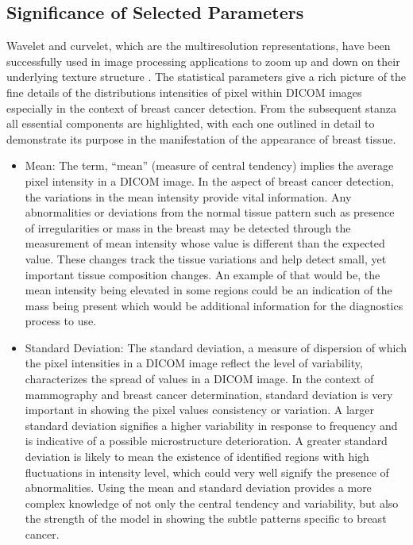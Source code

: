 \subsection{Significance of Selected Parameters}
Wavelet and curvelet, which are the multiresolution representations, have been successfully used in image processing applications to zoom up and down on their underlying texture structure \cite{MESELHYELTOUKHY2012123}. The statistical parameters give a rich picture of the fine details of the distributions intensities of pixel within DICOM images especially in the context of breast cancer detection. From the subsequent stanza all essential components are highlighted, with each one outlined in detail to demonstrate its purpose in the manifestation of the appearance of breast tissue.
\begin{itemize}
  \item Mean: The term, “mean” (measure of central tendency) implies the average pixel intensity in a DICOM image. In the aspect of breast cancer detection, the variations in the mean intensity provide vital information. Any abnormalities or deviations from the normal tissue pattern such as presence of irregularities or mass in the breast may be detected through the measurement of mean intensity whose value is different than the expected value. These changes track the tissue variations and help detect small, yet important tissue composition changes. An example of that would be, the mean intensity being elevated in some regions could be an indication of the mass being present which would be additional information for the diagnostics process to use.
  \item Standard Deviation: The standard deviation, a measure of dispersion of which the pixel intensities in a DICOM image reflect the level of variability, characterizes the spread of values in a DICOM image. In the context of mammography and breast cancer determination, standard deviation is very important in showing the pixel values consistency or variation. A larger standard deviation signifies a higher variability in response to frequency and is indicative of a possible microstructure deterioration. A greater standard deviation is likely to mean the existence of identified regions with high fluctuations in intensity level, which could very well signify the presence of abnormalities. Using the mean and standard deviation provides a more complex knowledge of not only the central tendency and variability, but also the strength of the model in showing the subtle patterns specific to breast cancer.

\end{itemize}
